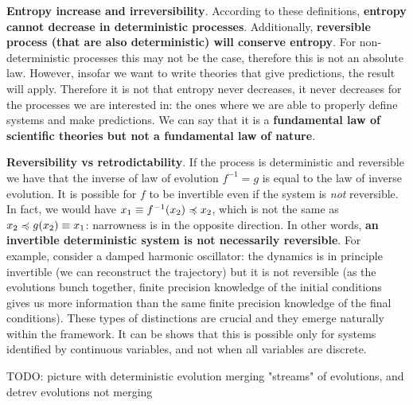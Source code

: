 \documentclass[10pt, onecolumn, longbibliography, nofootinbib]{revtex4-2}
\begin{document}
\textbf{Entropy increase and irreversibility}. According to these definitions, \textbf{entropy cannot decrease in deterministic processes}. Additionally, \textbf{reversible process (that are also deterministic) will conserve entropy}. For non-deterministic processes this may not be the case, therefore this is not an absolute law. However, insofar we want to write theories that give predictions, the result will apply. Therefore it is not that entropy never decreases, it never decreases for the processes we are interested in: the ones where we are able to properly define systems and make predictions. We can say that it is a \textbf{fundamental law of scientific theories but not a fundamental law of nature}.

\textbf{Reversibility vs retrodictability}. If the process is deterministic and reversible we have that the inverse of law of evolution $f^{-1}=g$ is equal to the law of inverse evolution. It is possible for $f$ to be invertible even if the system is \emph{not} reversible. In fact, we would have $x_1 \equiv f^{-1}(x_2) \preccurlyeq x_2$, which is not the same as $x_2 \preccurlyeq g(x_2) \equiv x_1$: narrowness is in the opposite direction. In other words, \textbf{an invertible deterministic system is not necessarily reversible}. For example, consider a damped harmonic oscillator: the dynamics is in principle invertible (we can reconstruct the trajectory) but it is not reversible (as the evolutions bunch together, finite precision knowledge of the initial conditions gives us more information than the same finite precision knowledge of the final conditions). These types of distinctions are crucial and they emerge naturally within the framework. It can be shows that this is possible only for systems identified by continuous variables, and not when all variables are discrete.

TODO: picture with deterministic evolution merging "streams" of evolutions, and detrev evolutions not merging
\end{document}
